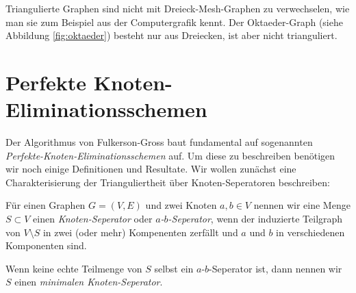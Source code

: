 \documentclass[../main.tex]{subfiles}
\begin{document}
\begin{bemerkung}
    Triangulierte Graphen sind nicht mit Dreieck-Mesh-Graphen zu verwechselen, wie man sie zum Beispiel aus der Computergrafik kennt. Der Oktaeder-Graph (siehe Abbildung \ref{fig:oktaeder}) besteht nur aus Dreiecken, ist aber nicht trianguliert.
\end{bemerkung}

\section{Perfekte Knoten-Eliminationsschemen}

Der Algorithmus von Fulkerson-Gross baut fundamental auf sogenannten \emph{Perfekte-Knoten-Eliminationsschemen} auf. Um diese zu beschreiben benötigen wir noch einige Definitionen und Resultate. Wir wollen zunächst eine Charakterisierung der Trianguliertheit über Knoten-Seperatoren beschreiben:

\begin{definition}\label{def:seperator}
    Für einen Graphen $G = (V, E)$ und zwei Knoten $a, b \in V$ nennen wir eine Menge $S \subset V$ einen \emph{Knoten-Seperator} oder \emph{$a$-$b$-Seperator}, wenn der induzierte Teilgraph von $V \setminus S$ in zwei (oder mehr) Kompenenten zerfällt und $a$ und $b$ in verschiedenen Komponenten sind.
    
    Wenn keine echte Teilmenge von $S$ selbst ein $a$-$b$-Seperator ist, dann nennen wir $S$ einen \emph{minimalen Knoten-Seperator}.
\end{definition}
\end{document}

